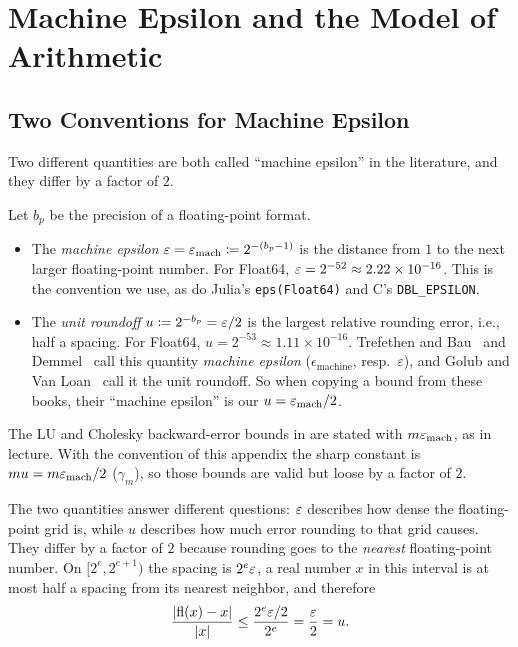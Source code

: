 \section{Machine Epsilon and the Model of Arithmetic}

\subsection{Two Conventions for Machine Epsilon}

Two different quantities are both called ``machine epsilon'' in the literature, and they differ by a factor of $2$.

\begin{definition}
  \label{def:eps}
  Let $b_p$ be the precision of a floating-point format.
  \begin{itemize}
    \item The \emph{machine epsilon} $\varepsilon = \varepsilon_{\mathrm{mach}} \coloneqq 2^{-(b_p - 1)}$ is the distance from $1$ to the next larger floating-point number. For Float64, $\varepsilon = 2^{-52} \approx 2.22 \times 10^{-16}$. This is the convention we use, as do Julia's \texttt{eps(Float64)} and C's \texttt{DBL\_EPSILON}.
    \item The \emph{unit roundoff} $u \coloneqq 2^{-b_p} = \varepsilon/2$ is the largest relative rounding error, i.e., half a spacing. For Float64, $u = 2^{-53} \approx 1.11 \times 10^{-16}$. Trefethen and Bau~\cite{TB} and Demmel~\cite{Demmel} call this quantity \emph{machine epsilon} ($\epsilon_{\text{machine}}$, resp.\ $\varepsilon$), and Golub and Van Loan~\cite{GVL} call it the unit roundoff. So when copying a bound from these books, their ``machine epsilon'' is our $u = \varepsilon_{\mathrm{mach}}/2$.
  \end{itemize}
\end{definition}

\begin{remark}
  The LU and Cholesky backward-error bounds in  are stated with $m\varepsilon_{\mathrm{mach}}$, as in lecture. With the convention of this appendix the sharp constant is $mu = m\varepsilon_{\mathrm{mach}}/2$ ($\gamma_m$), so those bounds are valid but loose by a factor of $2$.
\end{remark}

The two quantities answer different questions: $\varepsilon$ describes how dense the floating-point grid is, while $u$ describes how much error rounding to that grid causes. They differ by a factor of $2$ because rounding goes to the \emph{nearest} floating-point number. On $[2^e, 2^{e+1})$ the spacing is $2^e\varepsilon$, a real number $x$ in this interval is at most half a spacing from its nearest neighbor, and therefore
\begin{equation}
  \frac{\left\lvert \operatorname{fl}(x) - x \right\rvert}{\left\lvert x \right\rvert} \le \frac{2^e\varepsilon/2}{2^e} = \frac{\varepsilon}{2} = u.
\end{equation}

